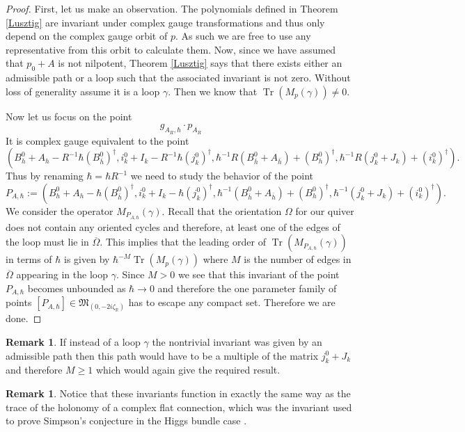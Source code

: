 \documentclass[12pt,oneside,reqno]{amsart}
\theoremstyle{definition}
\newtheorem{remark}[theorem]{Remark}
\numberwithin{equation}{section}
\numberwithin{theorem}{section}
\newcommand{\R}{\mathbb{R}}
\newcommand{\Tr}{\operatorname{Tr}}
\begin{document}
%
\begin{proof}
First, let  us make an observation. The polynomials defined in Theorem \ref{Lusztig} are invariant under complex gauge transformations and thus only depend on the complex gauge orbit of $p$. As such we are free to use any representative from this orbit to calculate them. Now, since we have assumed that $p_0+A$ is not nilpotent, Theorem \ref{Lusztig} says that there exists either an admissible path or a loop such that the associated invariant is not zero. Without loss of generality assume it is a loop $\gamma$. Then we know that $\Tr(M_p(\gamma))\neq 0$. 

Now let us focus on the point 
%
\begin{equation*}
g_{A_R,\hbar}\cdot p_{A_R}
\end{equation*}
%
It is complex gauge equivalent to the point 
%
\begin{equation*}
(B_h^0+A_h - R^{-1}\hbar(B_{\bar h}^0)^{\dagger}, i_k^0+ I_k - R^{-1}\hbar(j_k^0)^{\dagger}, \hbar^{-1}R(B_{\bar h}^0 + A_{\bar h}) + (B_h^0)^{\dagger}, \hbar^{-1}R(j_k^0+J_k)+(i_k^0)^{\dagger}). 
\end{equation*}
%
Thus by renaming $\hbar = \hbar R^{-1}$ we need to study the behavior of the point 
%
\begin{equation*}
P_{A,\hbar}:= (B_h^0+A_h - \hbar(B_{\bar h}^0)^{\dagger}, i_k^0+ I_k - \hbar(j_k^0)^{\dagger}, \hbar^{-1}(B_{\bar h}^0 + A_{\bar h}) + (B_h^0)^{\dagger}, \hbar^{-1}(j_k^0+J_k)+(i_k^0)^{\dagger}). 
\end{equation*}
%
We consider the operator $M_{P_{A,\hbar}}(\gamma)$. Recall that the orientation $\Omega$ for our quiver does not contain any oriented cycles and therefore, at least one of the edges of the loop must lie in $\overline{\Omega}$. This implies that the leading order of $\Tr(M_{P_{A,\hbar}}(\gamma))$ in terms of $\hbar$ is given by $\hbar^{-M}\Tr(M_p(\gamma))$ where $M$ is the number of edges in $\overline{\Omega}$ appearing in the loop $\gamma$. Since $M>0$ we see that this invariant of the point $P_{A,\hbar}$ becomes unbounded as $\hbar\to 0$ and therefore the one parameter family of points $[P_{A,\hbar}]\in \mathfrak M_{(0,-2i\zeta_{\R})}$ has to escape any compact set. Therefore we are done. 
\end{proof}
%
\begin{remark}
If instead of a loop $\gamma$ the nontrivial invariant was given by an admissible path then this path would have to be a multiple of the matrix $j_k^0+J_k$ and therefore $M\ge1$ which would again give the required result. 
\end{remark}
%
%
\begin{remark}
Notice that these invariants function in exactly the same way as the trace of the holonomy of a complex flat connection, which was the invariant used to prove Simpson's conjecture in the Higgs bundle case \cite{Schulz,DS}.
\end{remark}
%
\end{document}
